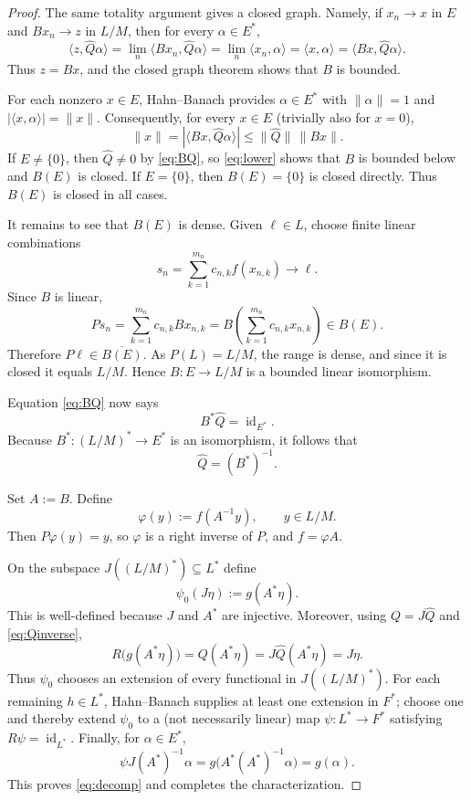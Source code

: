 \documentclass[11pt]{article}
\newcommand{\pair}[2]{\langle #1,#2\rangle}
\newcommand{\id}{\operatorname{id}}
\begin{document}
\begin{proof}
The same totality argument gives a closed graph. Namely, if $x_n\to x$ in $E$ and $Bx_n\to z$ in $L/M$, then for every $\alpha\in E^*$,
\[
 \pair{z}{\widehat Q\alpha}
 =\lim_n\pair{Bx_n}{\widehat Q\alpha}
 =\lim_n\pair{x_n}{\alpha}
 =\pair{x}{\alpha}
 =\pair{Bx}{\widehat Q\alpha}.
\]
Thus $z=Bx$, and the closed graph theorem shows that $B$ is bounded.

For each nonzero $x\in E$, Hahn--Banach provides $\alpha\in E^*$ with $\|\alpha\|=1$ and $|\pair{x}{\alpha}|=\|x\|$. Consequently, for every $x\in E$ (trivially also for $x=0$),
\begin{equation}\label{eq:lower}
  \|x\|
  =|\pair{Bx}{\widehat Q\alpha}|
  \leq \|\widehat Q\|\,\|Bx\|.
\end{equation}
If $E\ne\{0\}$, then $\widehat Q\ne0$ by \eqref{eq:BQ}, so \eqref{eq:lower} shows that $B$ is bounded below and $B(E)$ is closed. If $E=\{0\}$, then $B(E)=\{0\}$ is closed directly. Thus $B(E)$ is closed in all cases.

It remains to see that $B(E)$ is dense. Given $\ell\in L$, choose finite linear combinations
\[
  s_n=\sum_{k=1}^{m_n}c_{n,k}f(x_{n,k})\longrightarrow\ell.
\]
Since $B$ is linear,
\[
  Ps_n=\sum_{k=1}^{m_n}c_{n,k}Bx_{n,k}
      =B\!\left(\sum_{k=1}^{m_n}c_{n,k}x_{n,k}\right)\in B(E).
\]
Therefore $P\ell\in\overline{B(E)}$. As $P(L)=L/M$, the range is dense, and since it is closed it equals $L/M$. Hence $B:E\to L/M$ is a bounded linear isomorphism.

Equation \eqref{eq:BQ} now says
\[
  B^*\widehat Q=\id_{E^*}.
\]
Because $B^*:(L/M)^*\to E^*$ is an isomorphism, it follows that
\begin{equation}\label{eq:Qinverse}
  \widehat Q=(B^*)^{-1}.
\end{equation}

Set $A:=B$. Define
\[
  \varphi(y):=f(A^{-1}y),\qquad y\in L/M.
\]
Then $P\varphi(y)=y$, so $\varphi$ is a right inverse of $P$, and $f=\varphi A$.

On the subspace $J((L/M)^*)\subseteq L^*$ define
\[
  \psi_0(J\eta):=g(A^*\eta).
\]
This is well-defined because $J$ and $A^*$ are injective. Moreover, using $Q=J\widehat Q$ and \eqref{eq:Qinverse},
\[
  R\bigl(g(A^*\eta)\bigr)
  =Q(A^*\eta)
  =J\widehat Q(A^*\eta)
  =J\eta.
\]
Thus $\psi_0$ chooses an extension of every functional in $J((L/M)^*)$. For each remaining $h\in L^*$, Hahn--Banach supplies at least one extension in $F^*$; choose one and thereby extend $\psi_0$ to a (not necessarily linear) map $\psi:L^*\to F^*$ satisfying $R\psi=\id_{L^*}$. Finally, for $\alpha\in E^*$,
\[
  \psi J(A^*)^{-1}\alpha
  =g\bigl(A^*(A^*)^{-1}\alpha\bigr)
  =g(\alpha).
\]
This proves \eqref{eq:decomp} and completes the characterization.
\end{proof}
\end{document}
